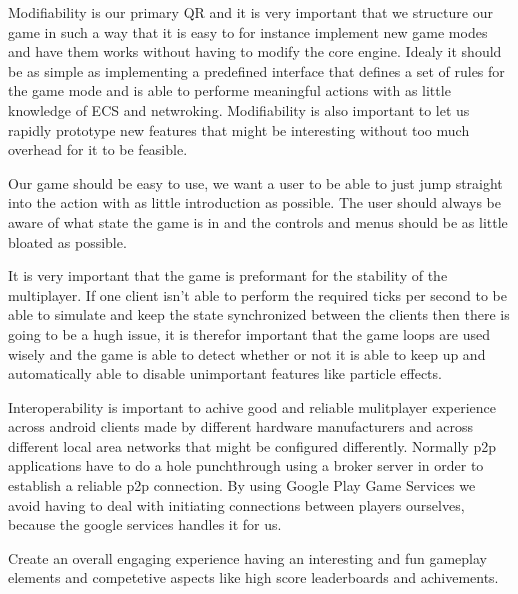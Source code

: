 
	Modifiability is our primary QR and it is very important that we structure our game in such a way that it is easy to for instance implement new game modes and have them works without having to modify the core engine. Idealy it should be as simple as implementing a predefined interface that defines a set of rules for the game mode and is able to performe meaningful actions with as little knowledge of ECS and netwroking. Modifiability is also important to let us rapidly prototype new features that might be interesting without too much overhead for it to be feasible.

	Our game should be easy to use, we want a user to be able to just jump straight into the action with as little introduction as possible. The user should always be aware of what state the game is in and the controls and menus should be as little bloated as possible.

	It is very important that the game is preformant for the stability of the multiplayer. If one client isn't able to perform the required ticks per second to be able to simulate	and keep the state synchronized between the clients then there is going to be a hugh issue, it is therefor important that the game loops are used wisely and the game is able to detect whether or not it is able to keep up and automatically able to disable unimportant features like particle effects.

	Interoperability is important to achive good and reliable mulitplayer experience across android clients made by different hardware manufacturers and across different local area networks that might be configured differently. Normally p2p applications have to do a hole punchthrough using a broker server in order to establish a reliable p2p connection. By using Google Play Game Services we avoid having to deal with initiating connections between players ourselves, because the google services handles it for us.


	Create an overall engaging experience having an interesting and fun gameplay elements and competetive aspects	like high score leaderboards and achivements.
